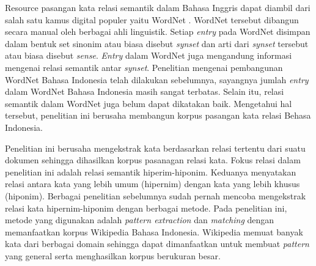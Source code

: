 Resource pasangan kata relasi semantik dalam Bahasa Inggris dapat diambil dari salah satu kamus digital populer yaitu WordNet \citep{miller1995wordnet}. WordNet tersebut dibangun secara manual oleh berbagai ahli linguistik. Setiap \textit{entry} pada WordNet disimpan dalam bentuk set sinonim atau biasa disebut \textit{synset} dan arti dari \textit{synset} tersebut atau biasa disebut \textit{sense}. \textit{Entry} dalam WordNet juga mengandung informasi mengenai relasi semantik antar \textit{synset}. Penelitian mengenai pembangunan WordNet Bahasa Indonesia telah dilakukan sebelumnya, sayangnya jumlah \textit{entry} dalam WordNet Bahasa Indonesia masih sangat terbatas. Selain itu, relasi semantik dalam WordNet juga belum dapat dikatakan baik. Mengetahui hal tersebut, penelitian ini berusaha membangun korpus pasangan kata relasi Behasa Indonesia.

Penelitian ini berusaha mengekstrak kata berdasarkan relasi tertentu dari suatu dokumen sehingga dihasilkan korpus pasanagan relasi kata. Fokus relasi dalam penelitian ini adalah relasi semantik hiperim-hiponim. Keduanya menyatakan relasi antara kata yang lebih umum (hipernim) dengan kata yang lebih khusus (hiponim). Berbagai penelitian sebelumnya sudah pernah mencoba mengekstrak relasi kata hipernim-hiponim dengan berbagai metode. Pada penelitian ini, metode yang digunakan adalah \textit{pattern extraction} dan \textit{matching} dengan memanfaatkan korpus Wikipedia Bahasa Indonesia. Wikipedia memuat banyak kata dari berbagai domain sehingga dapat dimanfaatkan untuk membuat \textit{pattern} yang general serta menghasilkan korpus berukuran besar.



